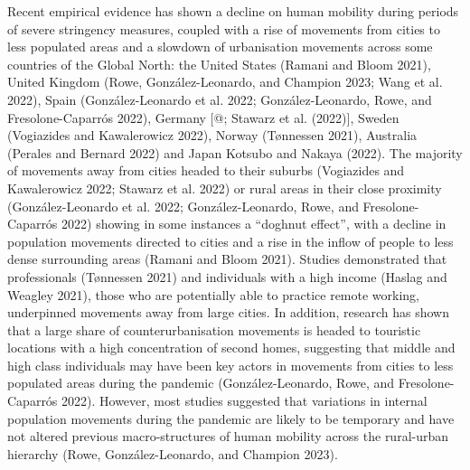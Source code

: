 \documentclass[11pt,letterpaper]{article}
\begin{document}
Recent empirical evidence has shown a decline on human mobility during
periods of severe stringency measures, coupled with a rise of movements
from cities to less populated areas and a slowdown of urbanisation
movements across some countries of the Global North: the United States
(Ramani and Bloom 2021), United Kingdom (Rowe, González-Leonardo, and
Champion 2023; Wang et al. 2022), Spain (González-Leonardo et al. 2022;
González-Leonardo, Rowe, and Fresolone-Caparrós 2022), Germany {[}@;
Stawarz et al. (2022){]}, Sweden (Vogiazides and Kawalerowicz 2022),
Norway (Tønnessen 2021), Australia (Perales and Bernard 2022) and Japan
Kotsubo and Nakaya (2022). The majority of movements away from cities
headed to their suburbs (Vogiazides and Kawalerowicz 2022; Stawarz et
al. 2022) or rural areas in their close proximity (González-Leonardo et
al. 2022; González-Leonardo, Rowe, and Fresolone-Caparrós 2022) showing
in some instances a ``doghnut effect'', with a decline in population
movements directed to cities and a rise in the inflow of people to less
dense surrounding areas (Ramani and Bloom 2021). Studies demonstrated
that professionals (Tønnessen 2021) and individuals with a high income
(Haslag and Weagley 2021), those who are potentially able to practice
remote working, underpinned movements away from large cities. In
addition, research has shown that a large share of counterurbanisation
movements is headed to touristic locations with a high concentration of
second homes, suggesting that middle and high class individuals may have
been key actors in movements from cities to less populated areas during
the pandemic (González-Leonardo, Rowe, and Fresolone-Caparrós 2022).
However, most studies suggested that variations in internal population
movements during the pandemic are likely to be temporary and have not
altered previous macro-structures of human mobility across the
rural-urban hierarchy (Rowe, González-Leonardo, and Champion 2023).
\end{document}
